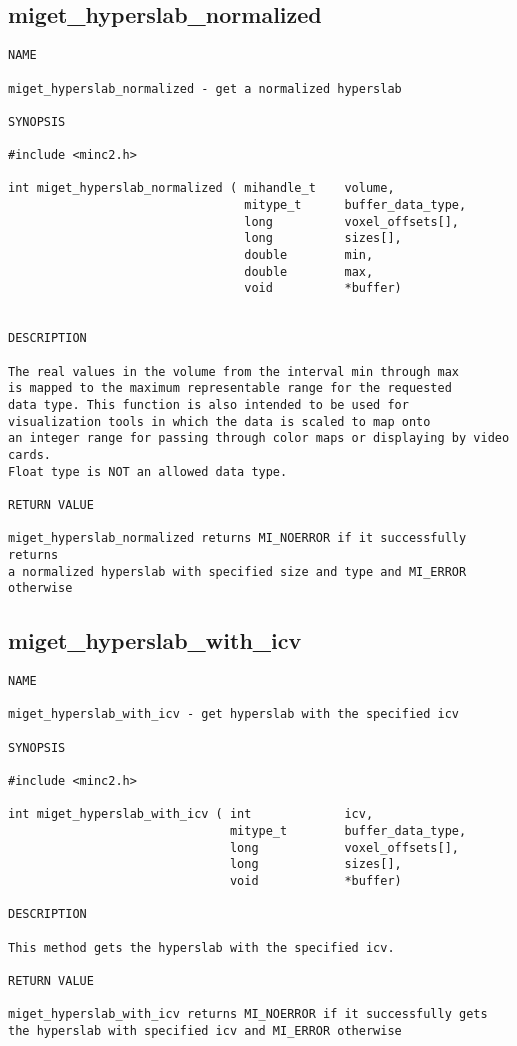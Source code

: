\documentclass{article}
\begin{document}
\subsection{miget\_hyperslab\_normalized}
\begin{verbatim}
NAME

miget_hyperslab_normalized - get a normalized hyperslab

SYNOPSIS

#include <minc2.h>

int miget_hyperslab_normalized ( mihandle_t    volume,
                                 mitype_t      buffer_data_type,
                                 long          voxel_offsets[],
                                 long          sizes[],
                                 double        min,
                                 double        max,
                                 void          *buffer)
                                  
                                
DESCRIPTION

The real values in the volume from the interval min through max
is mapped to the maximum representable range for the requested
data type. This function is also intended to be used for 
visualization tools in which the data is scaled to map onto 
an integer range for passing through color maps or displaying by video cards.
Float type is NOT an allowed data type.

RETURN VALUE

miget_hyperslab_normalized returns MI_NOERROR if it successfully returns
a normalized hyperslab with specified size and type and MI_ERROR otherwise
\end{verbatim}


\subsection{miget\_hyperslab\_with\_icv}
\begin{verbatim}
NAME

miget_hyperslab_with_icv - get hyperslab with the specified icv

SYNOPSIS

#include <minc2.h>

int miget_hyperslab_with_icv ( int             icv,
                               mitype_t        buffer_data_type,
                               long            voxel_offsets[],
                               long            sizes[],
                               void            *buffer)                
                                        
DESCRIPTION

This method gets the hyperslab with the specified icv.

RETURN VALUE

miget_hyperslab_with_icv returns MI_NOERROR if it successfully gets
the hyperslab with specified icv and MI_ERROR otherwise
\end{verbatim}
\end{document}
